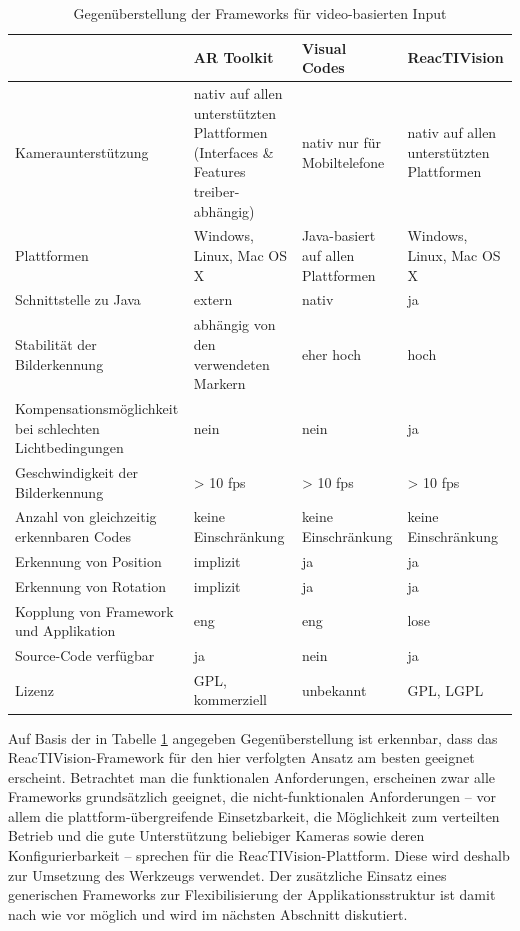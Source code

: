 \begin{table}[htbp]
	\centering
	\caption{Gegenüberstellung der Frameworks für video-basierten Input}
	\begin{tabular}{| p{3cm} || p{3cm} | p{3cm} | p{3cm} |} \hline
		 & AR Toolkit & Visual Codes & ReacTIVision \\ \hline \hline
		Kamera\-unterstützung 		  		& nativ auf allen unterstützten Plattformen (Interfaces \& Features treiber-abhängig) & nativ nur für Mobiltelefone & nativ auf allen unterstützten Plattformen \\ \hline
		Plattformen 			  	  		&  Windows, Linux, Mac OS X  & Java-basiert auf allen Plattformen & Windows, Linux, Mac OS X \\ \hline
		Schnittstelle zu Java 		  		& extern & nativ & ja \\ \hline
		Stabilität der Bilderkennung 	  	& abhängig von den verwendeten Markern & eher hoch & hoch \\ \hline
		Kompensations\-möglichkeit bei schlechten Lichtbedingungen & nein & nein & ja \\ \hline
		Geschwindigkeit der Bilderkennung 	& > 10 fps & > 10 fps & > 10 fps \\ \hline
		Anzahl von gleichzeitig erkennbaren Codes 		  			& keine Einschränkung & keine Einschränkung & keine Einschränkung \\ \hline
		Erkennung von Position 		  		& implizit & ja & ja \\ \hline
		Erkennung von Rotation 				& implizit & ja & ja \\ \hline
		Kopplung von Framework und Applikation & eng & eng & lose \\ \hline
		Source-Code verfügbar 			  	& ja & nein & ja \\ \hline
		Lizenz 				 				& GPL, kommerziell & unbekannt & GPL, LGPL \\ \hline
	\end{tabular}
	\label{tab:videobasierterInput}
\end{table}

Auf Basis der in Tabelle \ref{tab:videobasierterInput} angegeben Gegenüberstellung ist erkennbar, dass das ReacTIVision-Framework für den hier verfolgten Ansatz am besten geeignet erscheint. Betrachtet man die funktionalen Anforderungen, erscheinen zwar alle Frameworks grundsätzlich geeignet, die nicht-funktionalen Anforderungen -- vor allem die plattform-übergreifende Einsetzbarkeit, die Möglichkeit zum verteilten Betrieb und die gute Unterstützung beliebiger Kameras sowie deren Konfigurierbarkeit -- sprechen für die ReacTIVision-Plattform. Diese wird deshalb zur Umsetzung des Werkzeugs verwendet. Der zusätzliche Einsatz eines generischen Frameworks zur Flexibilisierung der Applikationsstruktur ist damit nach wie vor möglich und wird im nächsten Abschnitt diskutiert.

